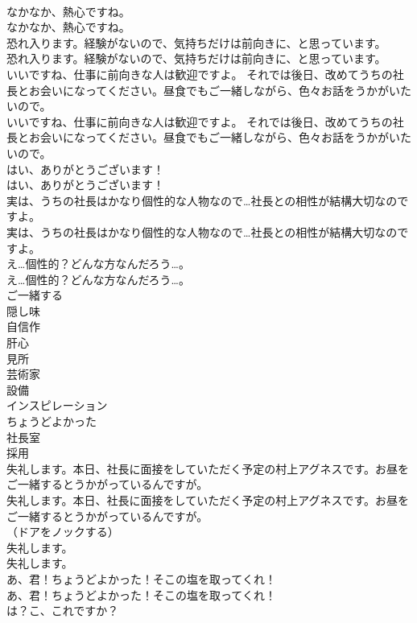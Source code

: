 \documentclass[8pt]{extreport}
\begin{document}
\begin{CJK}{UTF8}{min}
\\	なかなか、熱心ですね。	
\\	なかなか、熱心ですね。 
\\	恐れ入ります。経験がないので、気持ちだけは前向きに、と思っています。	
\\	恐れ入ります。経験がないので、気持ちだけは前向きに、と思っています。 
\\	いいですね、仕事に前向きな人は歓迎ですよ。 それでは後日、改めてうちの社長とお会いになってください。昼食でもご一緒しながら、色々お話をうかがいたいので。	
\\	いいですね、仕事に前向きな人は歓迎ですよ。 それでは後日、改めてうちの社長とお会いになってください。昼食でもご一緒しながら、色々お話をうかがいたいので。 
\\	はい、ありがとうございます！	
\\	はい、ありがとうございます！ 
\\	実は、うちの社長はかなり個性的な人物なので…社長との相性が結構大切なのですよ。	
\\	実は、うちの社長はかなり個性的な人物なので…社長との相性が結構大切なのですよ。 
\\	え…個性的？どんな方なんだろう…。	
\\	え…個性的？どんな方なんだろう…。 
\\	ご一緒する
\\	隠し味
\\	自信作
\\	肝心
\\	見所
\\	芸術家
\\	設備
\\	インスピレーション
\\	ちょうどよかった
\\	社長室
\\	採用
\\	失礼します。本日、社長に面接をしていただく予定の村上アグネスです。お昼をご一緒するとうかがっているんですが。	
\\	失礼します。本日、社長に面接をしていただく予定の村上アグネスです。お昼をご一緒するとうかがっているんですが。 
\\	（ドアをノックする）	
\\	失礼します。	
\\	失礼します。 
\\	あ、君！ちょうどよかった！そこの塩を取ってくれ！	
\\	あ、君！ちょうどよかった！そこの塩を取ってくれ！ 
\\	は？こ、これですか？	

\end{CJK}
\end{document}
